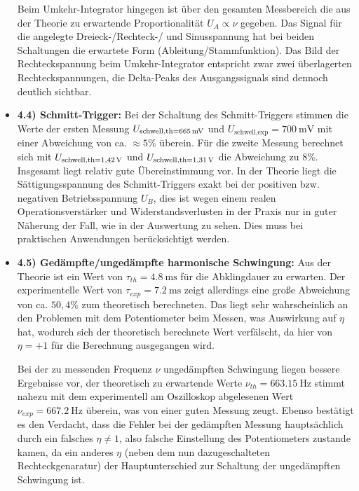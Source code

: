 \documentclass{scrartcl}
\begin{document}
\begin{itemize}
Beim Umkehr-Integrator hingegen ist über den gesamten Messbereich die aus der Theorie zu erwartende Proportionalität $U_A\propto \nu$ gegeben.
Das Signal für die angelegte Dreieck-/Rechteck-/ und Sinusspannung hat bei beiden Schaltungen die erwartete Form (Ableitung/Stammfunktion).
Das Bild der Rechteckspannung beim Umkehr-Integrator entspricht zwar zwei überlagerten Rechteckspannungen, die Delta-Peaks des Ausgangssignals sind dennoch deutlich sichtbar.
\item \textbf{4.4) Schmitt-Trigger:} Bei der Schaltung des Schmitt-Triggers stimmen die Werte der ersten Messung $U_\text{schwell,th=\SI{665}{\milli \volt}}$ und $U_\text{schwell,exp}=\SI{700}{\milli \volt}$ mit einer Abweichung von ca. $≈5\%$ überein.
Für die zweite Messung berechnet sich mit $U_\text{schwell,th=\SI{1,42}{\volt}}$ und $U_\text{schwell,th=\SI{1,31}{\volt}}$ die Abweichung zu $8\%$.
Insgesamt liegt relativ gute Übereinstimmung vor.
In der Theorie liegt die Sättigungsspannung des Schmitt-Triggers exakt bei der positiven bzw. negativen Betriebsspannung $U_B$, dies ist wegen einem realen Operationsverstärker und Widerstandsverlusten in der Praxis nur in guter Näherung der Fall, wie in der Auswertung zu sehen.
Dies muss bei praktischen Anwendungen berücksichtigt werden.
\item \textbf{4.5) Gedämpfte/ungedämpfte harmonische Schwingung:} Aus der Theorie ist ein Wert von $\tau_{th}=\SI{4,8}{\milli \second}$ für die Abklingdauer zu erwarten.
Der experimentelle Wert von $\tau_{exp}=\SI{7,2}{\milli \second}$ zeigt allerdings eine große Abweichung von  ca. $ 50,4\%$ zum theoretisch berechneten.
Das liegt sehr wahrscheinlich an den Problemen mit dem Potentiometer beim Messen, was Auswirkung auf $\eta$ hat, wodurch sich der theoretisch berechnete Wert verfälscht, da hier von $\eta=+1$ für die Berechnung ausgegangen wird.

Bei der zu messenden Frequenz $\nu$ ungedämpften Schwingung liegen bessere Ergebnisse vor, der theoretisch zu erwartende Werte $\nu_{th}=\SI{663,15}{\hertz}$ stimmt nahezu mit dem experimentell am Oszilloskop abgelesenen Wert $\nu_{exp}=\SI{667,2}{\hertz}$ überein, was von einer guten Messung zeugt.
Ebenso bestätigt es den Verdacht, dass die Fehler bei der gedämpften Messung hauptsächlich durch ein falsches $\eta \neq 1$, also falsche Einstellung des Potentiometers zustande kamen, da ein anderes $\eta$ (neben dem nun dazugeschalteten Rechteckgenaratur) der Hauptunterschied zur Schaltung der ungedämpften Schwingung ist.




\end{itemize}
\end{document}
